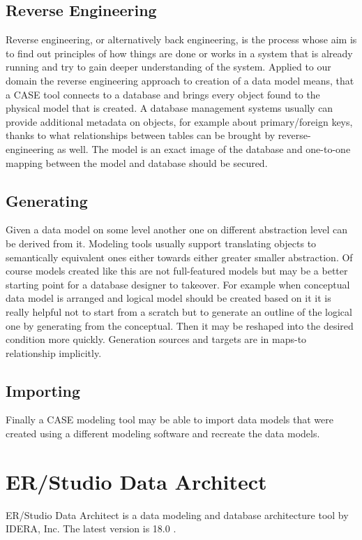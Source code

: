 \subsection{Reverse Engineering}
Reverse engineering, or alternatively back engineering, is the process whose aim is to find out principles of how things are done or works in a system that is already running and try to gain deeper understanding of the system.
Applied to our domain the reverse engineering approach to creation of a data model means, that a CASE tool connects to a database and brings every object found to the physical model that is created. A database management systems usually can provide additional metadata on objects, for example about primary/foreign keys, thanks to what relationships between tables can be brought by reverse-engineering as well. 
The model is an exact image of the database and one-to-one mapping between the model and database should be secured.

\subsection{Generating}
Given a data model on some level another one on different abstraction level can be derived from it. Modeling tools usually support translating objects to semantically equivalent ones either towards either greater smaller abstraction. Of course models created like this are not full-featured models but may be a better starting point for a database designer to takeover. For example when conceptual data model is arranged and logical model should be created based on it it is really helpful not to start from a scratch but to generate an outline of the logical one by generating from the conceptual. Then it may be reshaped into the desired condition more quickly. Generation sources and targets are in maps-to relationship implicitly.

\subsection{Importing}
Finally a CASE modeling tool may be able to import data models that were created using a different modeling software and recreate the data models.

\section{ER/Studio Data Architect}

ER/Studio Data Architect is a data modeling and database architecture tool by IDERA, Inc. 
The latest version is 18.0 \cite{ErStudio}.

